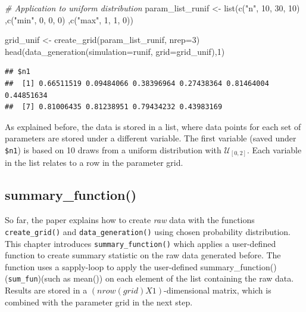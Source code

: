 \documentclass[11pt,a4paper]{article}
\newenvironment{Shaded}{\begin{snugshade}}{\end{snugshade}}
\newcommand{\AttributeTok}[1]{\textcolor[rgb]{0.77,0.63,0.00}{#1}}
\newcommand{\CommentTok}[1]{\textcolor[rgb]{0.56,0.35,0.01}{\textit{#1}}}
\newcommand{\DecValTok}[1]{\textcolor[rgb]{0.00,0.00,0.81}{#1}}
\newcommand{\FunctionTok}[1]{\textcolor[rgb]{0.00,0.00,0.00}{#1}}
\newcommand{\NormalTok}[1]{#1}
\newcommand{\OtherTok}[1]{\textcolor[rgb]{0.56,0.35,0.01}{#1}}
\newcommand{\StringTok}[1]{\textcolor[rgb]{0.31,0.60,0.02}{#1}}
\begin{document}
\begin{Shaded}
\begin{Highlighting}[]
\CommentTok{\# Application to uniform distribution}
\NormalTok{param\_list\_runif }\OtherTok{\textless{}{-}} \FunctionTok{list}\NormalTok{(}\FunctionTok{c}\NormalTok{(}\StringTok{"n"}\NormalTok{, }\DecValTok{10}\NormalTok{, }\DecValTok{30}\NormalTok{, }\DecValTok{10}\NormalTok{)}
\NormalTok{                         ,}\FunctionTok{c}\NormalTok{(}\StringTok{"min"}\NormalTok{, }\DecValTok{0}\NormalTok{, }\DecValTok{0}\NormalTok{, }\DecValTok{0}\NormalTok{)}
\NormalTok{                         ,}\FunctionTok{c}\NormalTok{(}\StringTok{"max"}\NormalTok{, }\DecValTok{1}\NormalTok{, }\DecValTok{1}\NormalTok{, }\DecValTok{0}\NormalTok{))}


\NormalTok{grid\_unif }\OtherTok{\textless{}{-}} \FunctionTok{create\_grid}\NormalTok{(param\_list\_runif, }\AttributeTok{nrep=}\DecValTok{3}\NormalTok{)}
\FunctionTok{head}\NormalTok{(}\FunctionTok{data\_generation}\NormalTok{(}\AttributeTok{simulation=}\NormalTok{runif, }\AttributeTok{grid=}\NormalTok{grid\_unif),}\DecValTok{1}\NormalTok{)}
\end{Highlighting}
\end{Shaded}

\begin{verbatim}
## $n1
##  [1] 0.66511519 0.09484066 0.38396964 0.27438364 0.81464004 0.44851634
##  [7] 0.81006435 0.81238951 0.79434232 0.43983169
\end{verbatim}

As explained before, the data is stored in a list, where data points for
each set of parameters are stored under a different variable. The first
variable (saved under \texttt{\$n1}) is based on 10 draws from a uniform
distribution with \(\mathcal{U}_{[0,2]}\). Each variable in the list
relates to a row in the parameter grid.

\hypertarget{summary_function}{%
\subsection{summary\_function()}\label{summary_function}}

So far, the paper explains how to create \emph{raw} data with the
functions \texttt{create\_grid()} and \texttt{data\_generation()} using
chosen probability distribution. This chapter introduces
\texttt{summary\_function()} which applies a user-defined function to
create summary statistic on the raw data generated before. The function
uses a sapply-loop to apply the user-defined
summary\_function()(\texttt{sum\_fun})(such as mean()) on each element
of the list containing the raw data. Results are stored in a
\((nrow(grid ) X 1)\)-dimensional matrix, which is combined with the
parameter grid in the next step.
\end{document}
